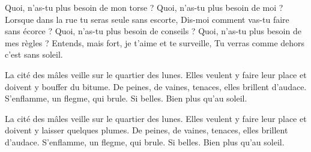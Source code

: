 Quoi, n'as-tu plus besoin de mon torse ?
Quoi, n'as-tu plus besoin de moi ?
Lorsque dans la rue tu seras seule sans escorte,
Dis-moi comment vas-tu faire sans écorce ?
Quoi, n'as-tu plus besoin de conseils ?
Quoi, n'as-tu plus besoin de mes règles ?
Entends, mais fort, je t’aime et te surveille,
Tu verras comme dehors c’est sans soleil.


La cité des mâles veille sur le quartier des lunes.
Elles veulent y faire leur place et doivent y bouffer du bitume.
De peines, de vaines, tenaces, elles brillent d'audace.
S'enflamme, un flegme, qui brule. Si belles.
Bien plus qu'au soleil.

La cité des mâles veille sur le quartier des lunes.
Elles veulent y faire leur place et doivent y laisser quelques plumes.
De peines, de vaines, tenaces, elles brillent d'audace.
S'enflamme, un flegme, qui brule. Si belles.
Bien plus qu'au soleil.

